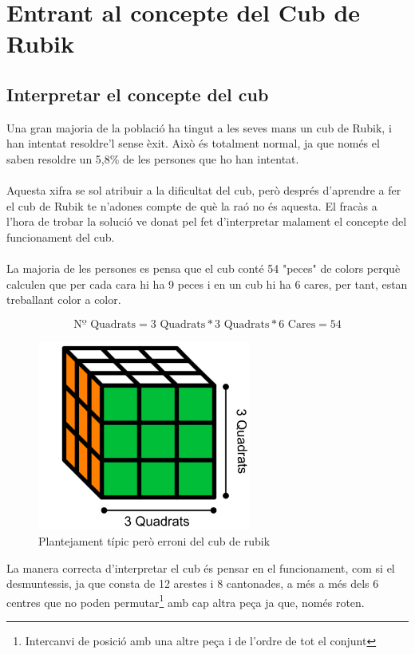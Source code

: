 \chapter{Entrant al concepte del Cub de Rubik}

\section{Interpretar el concepte del cub}

Una gran majoria de la població ha tingut a les seves mans un cub de Rubik, i han intentat
resoldre'l sense èxit. Això és totalment normal, ja que només el saben resoldre un 5,8\% de les
persones que ho han intentat. \cite{Redbull-cub}
\\\\Aquesta xifra se sol atribuir a la dificultat del cub, però després d'aprendre a fer el cub de
Rubik te n'adones compte de què la raó no és aquesta. El fracàs a l'hora de trobar la solució ve
donat pel fet d'interpretar malament el concepte del funcionament del cub.
\\\\La majoria de les persones es pensa que el cub conté 54 "peces" de colors perquè calculen que per cada cara hi ha 9 peces i en un cub hi ha 6 cares, per tant, estan treballant color a
color.

$$ \textrm{Nº Quadrats} = 3\textrm{ Quadrats}*3\textrm{ Quadrats}*6\textrm{ Cares} = 54 $$

\begin{figure}[ht]
    \centering
    \includegraphics[width=7cm]{img/figures/plantejament-no.png}
    \caption{Plantejament típic però erroni del cub de rubik}
    \label{fig:plantejament-no}
\end{figure}

La manera correcta d'interpretar el cub és pensar en el funcionament, com si el desmuntessis, ja que consta de 12 arestes i 8 cantonades, a més a més dels 6 centres que no poden permutar\footnote{Intercanvi de posició amb una altre peça i de l'ordre de tot el conjunt} amb cap altra peça ja que, només roten.

